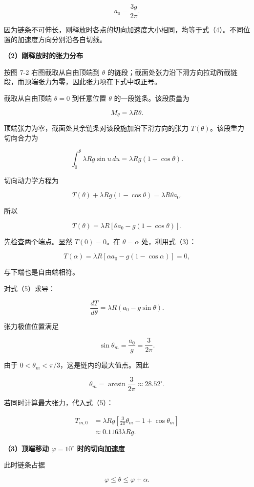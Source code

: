 \documentclass[12pt,a4paper,UTF8]{ctexart}
\begin{document}
\[
\boxed{a_0=\frac{3g}{2\pi}}.
\tag{4}
\]

因为链条不可伸长，刚释放时各点的切向加速度大小相同，均等于式（4）。不同位置的加速度方向分别沿各自切线。

\textbf{（2）刚释放时的张力分布}

按图 7-2 右图截取从自由顶端到 \(\theta\)
的链段；截面处张力沿下滑方向拉动所截链段，而顶端张力为零，因此张力项在下式中取正号。

截取从自由顶端 \(\theta=0\) 到任意位置 \(\theta\) 的一段链条。该段质量为

\[
M_\theta=\lambda R\theta.
\]

顶端张力为零，截面处其余链条对该段施加沿下滑方向的张力
\(T(\theta)\)。该段重力切向合力为

\[
\int_0^\theta\lambda Rg\sin u\,du
=\lambda Rg(1-\cos\theta).
\]

切向动力学方程为

\[
T(\theta)+\lambda Rg(1-\cos\theta)
=\lambda R\theta a_0.
\]

所以

\[
\boxed{
T(\theta)=\lambda R
\left[\theta a_0-g(1-\cos\theta)\right]
}.
\tag{5}
\]

先检查两个端点。显然 \(T(0)=0\)。在 \(\theta=\alpha\) 处，利用式（3）：

\[
T(\alpha)
=\lambda R[\alpha a_0-g(1-\cos\alpha)]=0,
\]

与下端也是自由端相符。

对式（5）求导：

\[
\frac{dT}{d\theta}
=\lambda R(a_0-g\sin\theta).
\tag{6}
\]

张力极值位置满足

\[
\sin\theta_m=\frac{a_0}{g}=\frac{3}{2\pi}.
\]

由于 \(0<\theta_m<\pi/3\)，这是链内的最大值点。因此

\[
\boxed{
\theta_m=\arcsin\frac{3}{2\pi}
\approx28.52^\circ
}.
\tag{7}
\]

若同时计算最大张力，代入式（5）：

\[
\begin{aligned}
T_{m,0}
&=\lambda Rg\left[
\frac{3}{2\pi}\theta_m-1+\cos\theta_m
\right]\\
&\approx0.1163\lambda Rg.
\end{aligned}
\tag{8}
\]

\textbf{（3）顶端移动 \(\varphi=10^\circ\) 时的切向加速度}

此时链条占据

\[
\varphi\leq\theta\leq\varphi+\alpha.
\]
\end{document}
